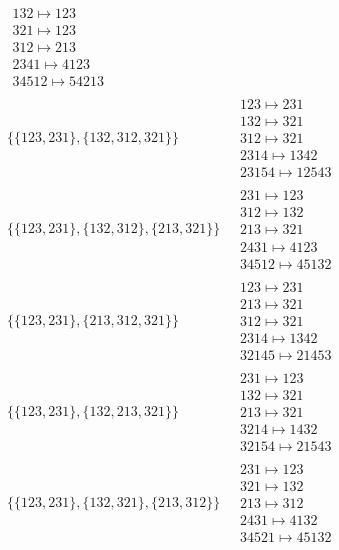 \begin{scriptsize}
\begin{align}
\begin{matrix}
132 \mapsto 123
\\
321 \mapsto 123
\\
312 \mapsto 213
\\
2341 \mapsto 4123
\\
34512 \mapsto 54213
\end{matrix}
\\
\{\{123, 231\}, \{132, 312, 321\}\}
\ 
&
\begin{matrix}
123 \mapsto 231
\\
132 \mapsto 321
\\
312 \mapsto 321
\\
2314 \mapsto 1342
\\
23154 \mapsto 12543
\end{matrix}
\\
\{\{123, 231\}, \{132, 312\}, \{213, 321\}\}
\ 
&
\begin{matrix}
231 \mapsto 123
\\
312 \mapsto 132
\\
213 \mapsto 321
\\
2431 \mapsto 4123
\\
34512 \mapsto 45132
\end{matrix}
\\
\{\{123, 231\}, \{213, 312, 321\}\}
\ 
&
\begin{matrix}
123 \mapsto 231
\\
213 \mapsto 321
\\
312 \mapsto 321
\\
2314 \mapsto 1342
\\
32145 \mapsto 21453
\end{matrix}
\\
\{\{123, 231\}, \{132, 213, 321\}\}
\ 
&
\begin{matrix}
231 \mapsto 123
\\
132 \mapsto 321
\\
213 \mapsto 321
\\
3214 \mapsto 1432
\\
32154 \mapsto 21543
\end{matrix}
\\
\{\{123, 231\}, \{132, 321\}, \{213, 312\}\}
\ 
&
\begin{matrix}
231 \mapsto 123
\\
321 \mapsto 132
\\
213 \mapsto 312
\\
2431 \mapsto 4132
\\
34521 \mapsto 45132
\end{matrix}
\\

\end{align}
\end{scriptsize}
